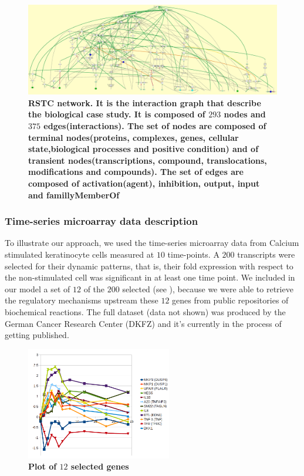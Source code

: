 \begin{figure}[!t]
 \centering
 \includegraphics[width=7.5in]{images/net.jpg}
\caption{{\bf RSTC network. It is the interaction graph that describe the biological case study. It is composed of $293$ nodes and $375$ edges(interactions).
The set of nodes are composed of terminal nodes(proteins, complexes, genes, cellular state,biological processes and positive condition) and of transient
nodes(transcriptions, compound, translocations, modifications and compounds). The set of edges are composed of activation(agent), inhibition, output, 
input and famillyMemberOf}} 
 \label{fig:network}
\end{figure}

\subsubsection{Time-series microarray data description}
\label{SECTSD}
To illustrate our approach, we used the time-series microarray data from Calcium stimulated keratinocyte cells 
 measured at $10$ time-points. A $200$ transcripts were selected for their dynamic patterns,
that is, their fold expression with respect to the non-stimulated cell was significant in at least one time point. 
We included in our model a set of $12$ of the $200$ selected (see ), because we were able to retrieve the regulatory mechanisms upstream
these $12$ genes from public repositories of biochemical reactions.
The full dataset (data not shown) was produced by the German Cancer Research Center (DKFZ) and it's currently in the process
of getting published.  

\begin{figure}[!t]
\centering
\includegraphics[width=2.5in]{images/12genes.png}
\caption{\bf Plot of $12$ selected genes}
\label{fig:tsd}
\end{figure}



